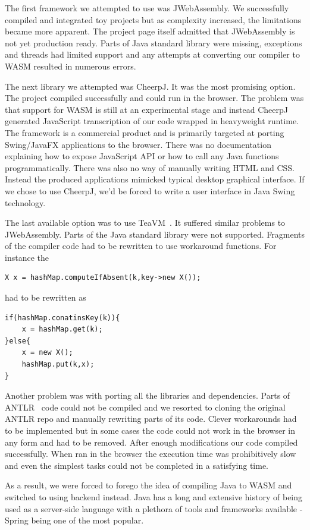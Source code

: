 The first framework we attempted to use was JWebAssembly. We successfully compiled and integrated toy projects but as complexity increased, the limitations became more apparent. The project page itself admitted that JWebAssembly is not yet production ready. Parts of Java standard library were missing, exceptions and threads had limited support and any attempts at converting our compiler to WASM resulted in numerous errors.

The next library we attempted was CheerpJ. It was the most promising option. The project compiled successfully and could run in the browser. The problem was that support for WASM is still at an experimental stage and instead CheerpJ generated JavaScript transcription of our code wrapped in heavyweight runtime. The framework is a commercial product and is primarily targeted at porting Swing/JavaFX applications to the browser. There was no documentation explaining how to expose JavaScript API or how to call any Java functions programmatically. There was also no way of manually writing HTML and CSS. Instead the produced applications mimicked typical desktop graphical interface. If we chose to use CheerpJ, we'd be forced to write a user interface in Java Swing technology.

The last available option was to use TeaVM\  \cite{teavm}. It suffered similar problems to JWebAssembly. Parts of the Java standard library were not supported. Fragments of the compiler code had to be rewritten to use workaround functions. For instance
the
\begin{lstlisting}
X x = hashMap.computeIfAbsent(k,key->new X());
\end{lstlisting}
had to be rewritten as
\begin{lstlisting}
if(hashMap.conatinsKey(k)){
    x = hashMap.get(k);
}else{
    x = new X();
    hashMap.put(k,x);
}
\end{lstlisting}
Another problem was with porting all the libraries and dependencies.
Parts of ANTLR\  \cite{antlr} code could not be compiled and we resorted to cloning the original ANTLR repo and manually rewriting parts of its code. Clever workarounds had to be implemented but in some cases the code could not work in the browser in any form and had to be removed.
After enough modifications our code compiled successfully.
When ran in the browser the execution time was prohibitively slow and even the simplest tasks could not be completed in a satisfying time.

As a result, we were forced to forego the idea of compiling Java to WASM and switched to using backend instead. Java has a long and extensive history of being used as a server-side language with a plethora of tools and frameworks available - Spring being one of the most popular.


